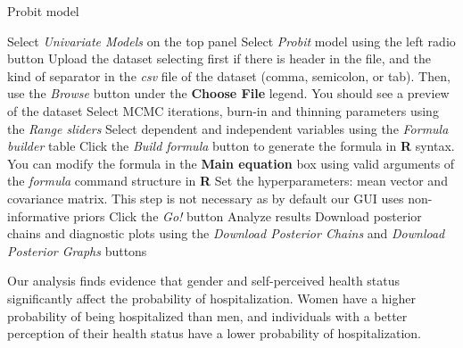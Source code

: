 \begin{algorithm}[h!]
	\caption{Probit model}\label{alg:Probit}
	\begin{algorithmic}[1]  		 			
		\State Select \textit{Univariate Models} on the top panel
		\State Select \textit{Probit} model using the left radio button
		\State Upload the dataset selecting first if there is header in the file, and the kind of separator in the \textit{csv} file of the dataset (comma, semicolon, or tab). Then, use the \textit{Browse} button under the \textbf{Choose File} legend. You should see a preview of the dataset
		\State Select MCMC iterations, burn-in and thinning parameters using the \textit{Range sliders}
		\State Select dependent and independent variables using the \textit{Formula builder} table
		\State Click the \textit{Build formula} button to generate the formula in \textbf{R} syntax. You can modify the formula in the \textbf{Main equation} box using valid arguments of the \textit{formula} command structure in \textbf{R}
		\State Set the hyperparameters: mean vector and covariance matrix. This step is not necessary as by default our GUI uses non-informative priors
		\State Click the \textit{Go!} button
		\State Analyze results
		\State Download posterior chains and diagnostic plots using the \textit{Download Posterior Chains} and \textit{Download Posterior Graphs} buttons
	\end{algorithmic} 
\end{algorithm}


Our analysis finds evidence that gender and self-perceived health status significantly affect the probability of hospitalization. Women have a higher probability of being hospitalized than men, and individuals with a better perception of their health status have a lower probability of hospitalization.

